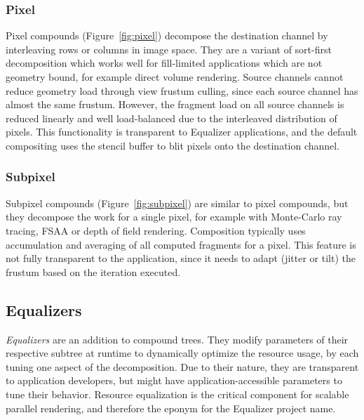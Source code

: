 \documentclass[10pt,journal,compsoc]{IEEEtran}
\newcommand{\fig}[1]{Figure~\ref{#1}}
\begin{document}
\subsubsection{Pixel}

Pixel compounds (\fig{fig:pixel}) decompose the destination channel by
interleaving rows or columns in image space. They are a variant of sort-first
decomposition which works well for fill-limited applications which are not
geometry bound, for example direct volume rendering. Source channels cannot
reduce geometry load through view frustum culling, since each source channel has
almost the same frustum. However, the fragment load on all source channels is
reduced linearly and well load-balanced due to the interleaved distribution of
pixels. This functionality is transparent to \textsf{Equalizer} applications,
and the default compositing uses the stencil buffer to blit pixels onto the
destination channel.

\subsubsection{Subpixel}

Subpixel compounds (\fig{fig:subpixel}) are similar to pixel compounds, but they
decompose the work for a single pixel, for example with Monte-Carlo ray tracing,
FSAA or depth of field rendering. Composition typically uses accumulation and
averaging of all computed fragments for a pixel. This feature is not fully
transparent to the application, since it needs to adapt (jitter or tilt) the
frustum based on the iteration executed.


\subsection{Equalizers}

{\em Equalizers} are an addition to compound trees. They modify parameters of
their respective subtree at runtime to dynamically optimize the resource usage,
by each tuning one aspect of the decomposition. Due to their nature, they are
transparent to application developers, but might have application-accessible
parameters to tune their behavior. Resource equalization is the critical
component for scalable parallel rendering, and therefore the eponym for the
\textsf{Equalizer} project name.
\end{document}
